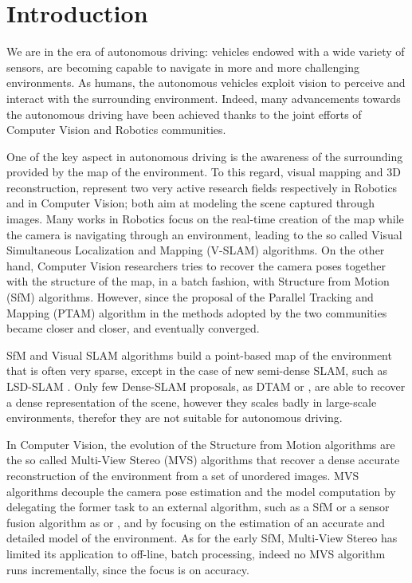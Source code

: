 
\chapter{Introduction}
\label{sec:intro}
We are in the era of autonomous driving: vehicles endowed with a wide variety of sensors, are becoming  capable to navigate in more and more challenging environments.
As humans, the autonomous vehicles exploit vision to perceive and interact with the surrounding environment.
Indeed, many advancements towards the autonomous driving have been achieved thanks to the joint efforts of Computer Vision and Robotics communities.


One of the key aspect in autonomous driving is the awareness of the surrounding provided by the map of the environment. 
To this regard, visual mapping and 3D reconstruction, represent two very active research fields respectively in Robotics and in Computer Vision; both aim at modeling the scene captured through images.
Many works in Robotics focus on the real-time creation of the map while the camera is navigating through an environment, leading to the so called Visual Simultaneous Localization and Mapping (V-SLAM) algorithms. 
On the other hand, Computer Vision researchers tries to recover the  camera poses together with the structure of the map, in a batch fashion, with Structure from Motion (SfM) algorithms.
However, since the proposal of the Parallel Tracking and Mapping (PTAM) algorithm in \cite{klein_murray07} the methods adopted by the two communities became closer and closer, and eventually converged.

SfM and Visual SLAM algorithms build a point-based map of the environment that is often very sparse, except in the case of new semi-dense SLAM, such as LSD-SLAM \cite{engel2014lsd}. 
Only few Dense-SLAM proposals, as DTAM \cite{newcombe2011dtam} or \cite{newcombe2010live}, are able to recover a dense representation of the scene, however they scales badly in large-scale environments, therefor they are not suitable for autonomous driving.

In Computer Vision, the evolution of the Structure from Motion algorithms are the  so called Multi-View Stereo (MVS) algorithms that recover a dense accurate reconstruction of the environment from a set of unordered images. 
MVS algorithms decouple the camera pose estimation and the model computation by delegating the former task to an external algorithm, such as a SfM or a sensor fusion algorithm as \cite{mouragnon_et_al07} or \cite{cucci_matteucci13}, and by focusing on the estimation of an accurate and detailed model of the environment.
As for the early SfM,  Multi-View Stereo has limited its application to off-line, batch processing, indeed no MVS algorithm runs incrementally, since the focus is on accuracy.


